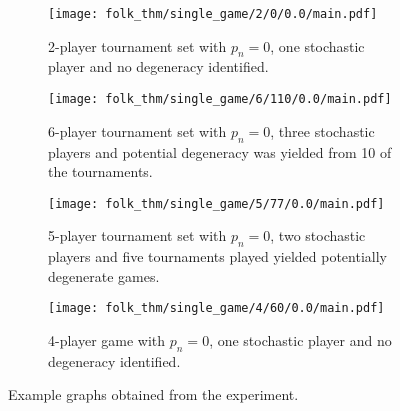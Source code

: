 \begin{figure}
    \centering
    \begin{subfigure}{0.45\textwidth}
        \centering
        \texttt{[image: folk\_thm/single\_game/2/0/0.0/main.pdf]}
        \caption{2-player tournament set with \(p_{n}=0\), one stochastic player and no degeneracy identified.}\label{subfig:clear_thresh_plot}
    \end{subfigure}
    \hspace{3pt}
    \begin{subfigure}{0.45\textwidth}
        \centering
        \texttt{[image: folk\_thm/single\_game/6/110/0.0/main.pdf]}
        \caption{6-player tournament set with \(p_{n}=0\), three stochastic players and potential degeneracy was yielded from 10 of the tournaments.}\label{subfig:unclear_thresh_plot}
    \end{subfigure}

    \vspace{5pt}

    \begin{subfigure}{0.45\textwidth}
        \centering
        \texttt{[image: folk\_thm/single\_game/5/77/0.0/main.pdf]}
        \caption{5-player tournament set with \(p_{n}=0\), two stochastic players and five tournaments played yielded potentially degenerate games.}\label{subfig:degenerate_plot}
    \end{subfigure}
    \hspace{3pt}
    \begin{subfigure}{0.45\textwidth}
        \centering
        \texttt{[image: folk\_thm/single\_game/4/60/0.0/main.pdf]}
        \caption{4-player game with \(p_{n}=0\), one stochastic player and no degeneracy identified.}\label{subfig:constant_plot}
    \end{subfigure}
    \caption{Example graphs obtained from the experiment.}\label{fig:example_graphs}
\end{figure}

